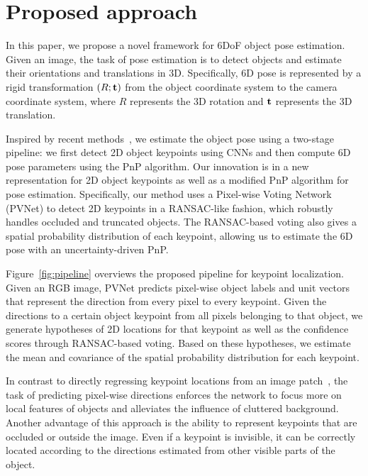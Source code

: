 \documentclass[10pt,twocolumn,letterpaper]{article}
\begin{document}
\section{Proposed approach}%

In this paper, we propose a novel framework for 6DoF object pose estimation. Given an image, the task of pose estimation is to detect objects and estimate their orientations and translations in 3D. Specifically, 6D pose is represented by a rigid transformation $(R; {\bf t})$ from the object coordinate system to the camera coordinate system, where $R$ represents the 3D rotation and $\bf t$ represents the 3D translation.

Inspired by recent methods~\cite{pavlakos20176, rad2017bb8, tekin2018real}, we estimate the object pose using a two-stage pipeline: we first detect 2D object keypoints using CNNs and then compute 6D pose parameters using the PnP algorithm. Our innovation is in a new representation for 2D object keypoints as well as a modified PnP algorithm for pose estimation. Specifically, our method uses a Pixel-wise Voting Network (PVNet) to detect 2D keypoints in a RANSAC-like fashion, which robustly handles occluded and truncated objects. The RANSAC-based voting also gives a spatial probability distribution of each keypoint, allowing us to estimate the 6D pose with an uncertainty-driven PnP.


Figure~\ref{fig:pipeline} overviews the proposed pipeline for keypoint localization. Given an RGB image, PVNet predicts pixel-wise object labels and unit vectors that represent the direction from every pixel to every keypoint. Given the directions to a certain object keypoint from all pixels belonging to that object, we generate hypotheses of 2D locations for that keypoint as well as the confidence scores through RANSAC-based voting. Based on these hypotheses, we estimate the mean and covariance of the spatial probability distribution for each keypoint.

In contrast to directly regressing keypoint locations from an image patch~\cite{rad2017bb8, tekin2018real}, the task of predicting pixel-wise directions enforces the network to focus more on local features of objects and alleviates the influence of cluttered background. Another advantage of this approach is the ability to represent keypoints that are occluded or outside the image. Even if a keypoint is invisible, it can be correctly located according to the directions estimated from other visible parts of the object.
\end{document}
